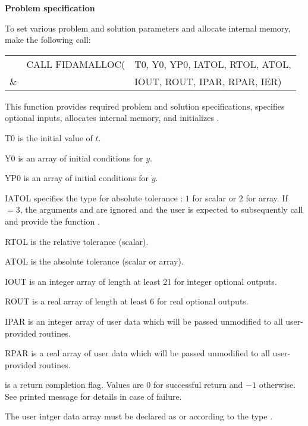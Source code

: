 \begin{Steps}
\item {\bf Problem specification}

  To set various problem and solution parameters and allocate
  internal memory, make the following call:
  {
    \begin{tabular}[t]{@{}r@{}l@{}l}
        &CALL FIDAMALLOC(&T0, Y0, YP0, IATOL, RTOL, ATOL,  \\
    {\&}&                &IOUT, ROUT, IPAR, RPAR, IER)
  \end{tabular}
  }
  {
    This function provides required problem and solution specifications, 
    specifies optional inputs,
    allocates internal memory, and initializes {\ida}.
  }
  {
    \begin{args}[IATOL]
    \item[T0] is the initial value of $t$.
    \item[Y0] is an array of initial conditions for $y$.
    \item[YP0] is an array of initial conditions for $\dot{y}$.
    \item[IATOL] specifies the type for absolute tolerance :
      $1$ for scalar or $2$ for array. If $=3$, the arguments
       and  are ignored and the user is expected to
      subsequently call  and provide the function .
    \item[RTOL] is the relative tolerance (scalar).
    \item[ATOL] is the absolute tolerance (scalar or array).
    \item[IOUT] is an integer array of length at least 21 for integer optional
                outputs.
    \item[ROUT] is a real array of length at least 6 for real optional outputs.
    \item[IPAR] is an integer array of user data which will be passed
      unmodified to all user-provided routines.
    \item[RPAR] is a real array of user data which will be passed
      unmodified to all user-provided routines.
    \end{args}
  }
  {
     is a return completion flag.  Values are $0$ for successful return
    and $-1$ otherwise. See printed message for details in case of failure.
  }
  {
    The user intger data array  must be declared as  or 
     according to the {\C} type .

}
\end{Steps}
